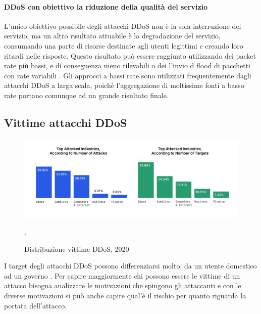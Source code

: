 \paragraph{DDoS con obiettivo la riduzione della qualità del servizio}
\label{paragraph:ddos_degradation}

L'unico obiettivo possibile degli attacchi DDoS non è la sola interruzione del servizio, ma un altro risultato attuabile è la degradazione del servizio, consumando una parte di risorse destinate agli utenti legittimi e creando loro ritardi nelle risposte. Questo risultato può essere raggiunto utilizzando dei packet rate più bassi, e di conseguenza meno rilevabili o dei l'invio d flood di pacchetti con rate variabili \cite{ddos_survey_3, ddos_survey_4}.
Gli approcci a bassi rate sono utilizzati frequentemente dagli attacchi DDoS a larga scala, poichè l'aggregazione di moltissime fonti a basso rate portano comunque ad un grande risultato finale.

\subsection{Vittime attacchi DDoS}

\begin{figure}[h]
    \includegraphics[width=\hsize]{images/introduzione/bersagli_ddos.png}
    \caption{Distribuzione vittime DDoS, 2020 \cite{imperva_ddos_report}}.
    \centering
\end{figure}

I target degli attacchi DDoS possono differenziarsi molto: da un utente domestico ad un governo \cite{ddos_motivations}. Per capire maggiormente chi possono essere le vittime di un attacco bisogna analizzare le motivazioni che spingono gli attaccanti e con le diverse motivazioni si può anche capire qual'è il rischio per quanto riguarda la portata dell'attacco. 

